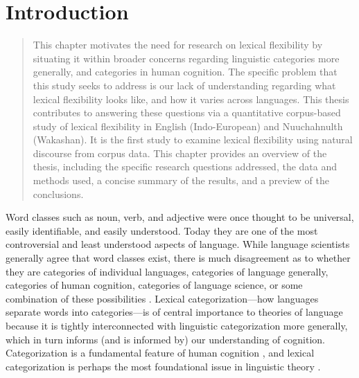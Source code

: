 \chapter{Introduction}
\label{ch:introduction}

\blockquote{This chapter motivates the need for research on lexical flexibility by situating it within broader concerns regarding linguistic categories more generally, and categories in human cognition. The specific problem that this study seeks to address is our lack of understanding regarding what lexical flexibility looks like, and how it varies across languages. This thesis contributes to answering these questions via a quantitative corpus-based study of lexical flexibility in English (Indo-European) and Nuuchahnulth (Wakashan). It is the first study to examine lexical flexibility using natural discourse from corpus data. This chapter provides an overview of the thesis, including the specific research questions addressed, the data and methods used, a concise summary of the results, and a preview of the conclusions.}

Word classes such as noun, verb, and adjective were once thought to be universal, easily identifiable, and easily understood. Today they are one of the most controversial and least understood aspects of language. While language scientists generally agree that word classes exist, there is much disagreement as to whether they are categories of individual languages, categories of language generally, categories of human cognition, categories of language science, or some combination of these possibilities . Lexical categorization—how languages separate words into categories—is of central importance to theories of language because it is tightly interconnected with linguistic categorization more generally, which in turn informs (and is informed by) our understanding of cognition. Categorization is a fundamental feature of human cognition , and lexical categorization is perhaps the most foundational issue in linguistic theory .
